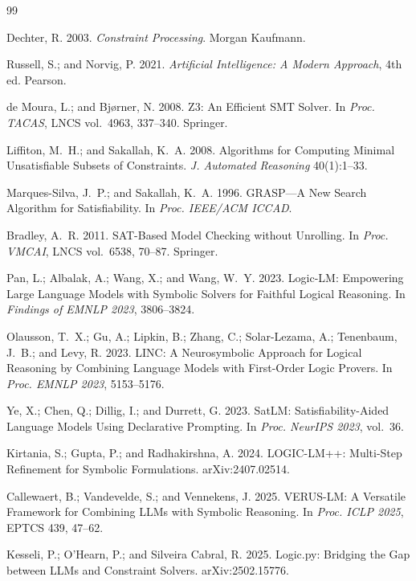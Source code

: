 \documentclass[UTF8,a4paper,12pt]{ctexart}
\begin{document}
\begin{thebibliography}{99}

Dechter, R. 2003. \textit{Constraint Processing}. Morgan Kaufmann.

Russell, S.; and Norvig, P. 2021. \textit{Artificial Intelligence: A Modern Approach}, 4th ed. Pearson.

de Moura, L.; and Bj\o{}rner, N. 2008. Z3: An Efficient SMT Solver.
In \textit{Proc. TACAS}, LNCS vol.~4963, 337--340. Springer.

Liffiton, M.~H.; and Sakallah, K.~A. 2008. Algorithms for Computing Minimal
Unsatisfiable Subsets of Constraints. \textit{J. Automated Reasoning} 40(1):1--33.

Marques-Silva, J.~P.; and Sakallah, K.~A. 1996. GRASP---A New Search Algorithm for Satisfiability.
In \textit{Proc. IEEE/ACM ICCAD}.

Bradley, A.~R. 2011. SAT-Based Model Checking without Unrolling.
In \textit{Proc. VMCAI}, LNCS vol.~6538, 70--87. Springer.

Pan, L.; Albalak, A.; Wang, X.; and Wang, W.~Y. 2023.
Logic-LM: Empowering Large Language Models with Symbolic Solvers for Faithful Logical Reasoning.
In \textit{Findings of EMNLP 2023}, 3806--3824.

Olausson, T.~X.; Gu, A.; Lipkin, B.; Zhang, C.; Solar-Lezama, A.; Tenenbaum, J.~B.; and Levy, R. 2023.
LINC: A Neurosymbolic Approach for Logical Reasoning by Combining Language Models with First-Order Logic Provers.
In \textit{Proc. EMNLP 2023}, 5153--5176.

Ye, X.; Chen, Q.; Dillig, I.; and Durrett, G. 2023.
SatLM: Satisfiability-Aided Language Models Using Declarative Prompting.
In \textit{Proc. NeurIPS 2023}, vol.~36.

Kirtania, S.; Gupta, P.; and Radhakirshna, A. 2024.
LOGIC-LM++: Multi-Step Refinement for Symbolic Formulations.
arXiv:2407.02514.

Callewaert, B.; Vandevelde, S.; and Vennekens, J. 2025.
VERUS-LM: A Versatile Framework for Combining LLMs with Symbolic Reasoning.
In \textit{Proc. ICLP 2025}, EPTCS 439, 47--62.

Kesseli, P.; O'Hearn, P.; and Silveira Cabral, R. 2025.
Logic.py: Bridging the Gap between LLMs and Constraint Solvers.
arXiv:2502.15776.


\end{thebibliography}
\end{document}
